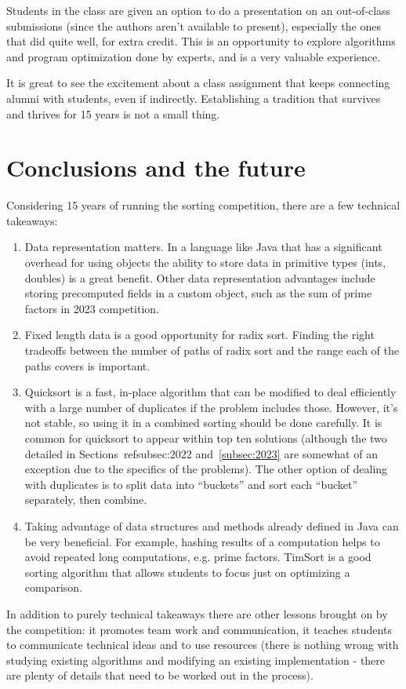 \documentclass[12pt]{article}
\begin{document}
Students in the class are given an option to do a presentation on an out-of-class submissions (since the authors aren't available to present), especially the ones that did quite well, for extra credit. This is an opportunity to explore algorithms and program optimization done by experts, and is a very valuable experience. 

It is great to see the excitement about a class assignment that keeps connecting alumni with students, even if indirectly. Establishing a tradition that survives and thrives for 15 years is not a small thing. 

\section{Conclusions and the future}\label{sec:conclusions}
Considering 15 years of running the sorting competition, there are a few technical takeaways:
\begin{enumerate}
\item Data representation matters. In a language like Java that has a significant overhead for using objects the ability to store data in primitive types (ints, doubles) is a great benefit. Other data representation advantages include storing precomputed fields in a custom object, such as the sum of prime factors in 2023 competition.  
\item Fixed length data is a good opportunity for radix sort. Finding the right tradeoffs between the number of paths of radix sort and the range each of the paths covers is important. 
\item Quicksort is a fast, in-place algorithm that can be modified to deal efficiently with a large number of duplicates if the problem includes those. However, it's not stable, so using it in a combined sorting should be done carefully.  It is common for quicksort to appear within top ten solutions (although the two detailed in Sections~ref{subsec:2022} and~\ref{subsec:2023} are somewhat of an exception due to the specifics of the problems). The other option of dealing with duplicates is to split data into ``buckets'' and sort each ``bucket'' separately, then combine.
\item Taking advantage of data structures and methods already defined in Java can be very beneficial.
For example, hashing results of a computation helps to avoid repeated long computations, e.g. prime factors. TimSort is a good sorting algorithm that allows students to focus just on optimizing a comparison.  
\end{enumerate}
In addition to purely technical takeaways there are other lessons brought on by the competition: it promotes team work and communication, it teaches students to communicate technical ideas and to use resources (there is nothing wrong with studying existing algorithms and modifying an existing implementation - there are plenty of details that need to be worked out in the process). 
\end{document}
